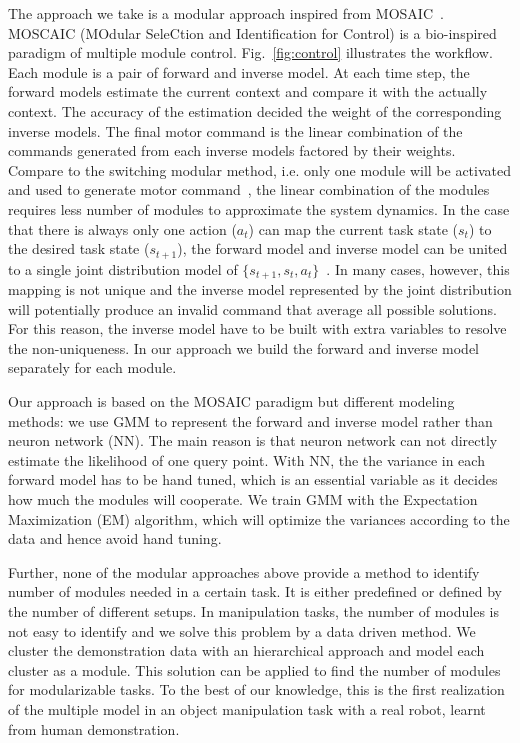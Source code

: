 The approach we take is a modular approach inspired from MOSAIC~\cite{haruno2001mosaic}. MOSCAIC (MOdular SeleCtion and Identification for Control) is a bio-inspired paradigm of multiple module control. Fig.~\ref{fig:control} illustrates the workflow. Each module is a pair of forward and inverse model. At each time step, the forward models estimate the current context and compare it with the actually context. The accuracy of the estimation decided the weight of the corresponding inverse models.
The final motor command is the linear combination of the commands generated from each inverse models factored by their weights. Compare to the switching modular method, i.e. only one module will be activated and used to generate motor command~\cite{narendra1997adaptive}, the linear combination of the modules requires less number of modules to approximate the system dynamics. In the case that there is always only one action ($a_t$) can map the current task state ($s_t$) to the desired task state ($s_{t+1}$), the forward model and inverse model can be united to a single joint distribution model of $\{s_{t+1}, s_t, a_t\}$~\cite{petkos2006learning}. In many cases, however, this mapping is not unique and the inverse model represented by the joint distribution will potentially produce an invalid command that average all possible solutions. For this reason, the inverse model have to be built with extra variables to resolve the non-uniqueness. In our approach we build the forward and inverse model separately for each module.

Our approach is based on the MOSAIC paradigm but different modeling methods: we use GMM to represent the forward and inverse model rather than neuron network (NN). The main reason is that neuron network can not directly estimate the likelihood of one query point. With NN, the the variance in each forward model has to be hand tuned, which is an essential variable as it decides how much the modules will cooperate. We train GMM with the Expectation Maximization (EM) algorithm, which will optimize the variances according to the data and hence avoid hand tuning.

Further, none of the modular approaches above provide a method to identify number of modules needed in a certain task. It is either predefined or defined by the number of different setups. In manipulation tasks, the number of modules is not easy to identify and we solve this problem by a data driven method. We cluster the demonstration data with an hierarchical approach and model each cluster as a module. This solution can be applied to find the number of modules for modularizable tasks. To the best of our knowledge, this is the first realization of the multiple model in an object manipulation task with a real robot, learnt from human demonstration.

